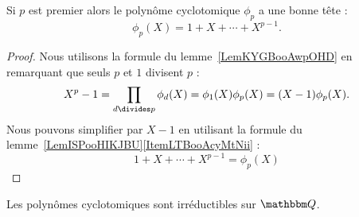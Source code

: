 \begin{corollary}   \label{CorTVUooErJiAC}
    Si \( p\) est premier alors le polynôme cyclotomique \( \phi_p\) a une bonne tête :
    \begin{equation}
        \phi_p(X)=1+X+\cdots +X^{p-1}.
    \end{equation}
\end{corollary}

\begin{proof}
    Nous utilisons la formule du lemme~\ref{LemKYGBooAwpOHD} en remarquant que seuls \( p\) et \( 1\) divisent \( p\) :
    \begin{equation}
        X^p-1=\prod_{d\divides p}\phi_d(X)=\phi_1(X)\phi_p(X)=(X-1)\phi_p(X).
    \end{equation}
    Nous pouvons simplifier par \( X-1\) en utilisant la formule du lemme~\ref{LemISPooHIKJBU}\ref{ItemLTBooAcyMtNii} :
    \begin{equation}
        1+X+\cdots +X^{p-1}=\phi_p(X)
    \end{equation}
\end{proof}

\begin{proposition}      \label{PropoIeOVh}
    Les polynômes cyclotomiques sont irréductibles sur \( \eQ\).
\end{proposition}

